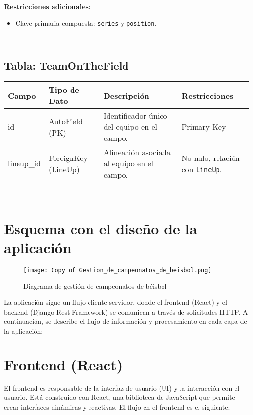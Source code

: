 \documentclass{report}
\begin{document}
    \textbf{Restricciones adicionales:}
    \begin{itemize}
        \item Clave primaria compuesta: \texttt{series} y \texttt{position}.
    \end{itemize}
    
    ---
    
    \subsection*{Tabla: TeamOnTheField}
    \begin{tabular}{|>{\raggedright\arraybackslash}p{3cm}|>{\raggedright\arraybackslash}p{3cm}|>{\raggedright\arraybackslash}p{6cm}|>{\raggedright\arraybackslash}p{4cm}|}
        \hline
        \textbf{Campo} & \textbf{Tipo de Dato} & \textbf{Descripción} & \textbf{Restricciones} \\
        \hline
        id & AutoField (PK) & Identificador único del equipo en el campo. & Primary Key \\
        \hline
        lineup\_id & ForeignKey (LineUp) & Alineación asociada al equipo en el campo. & No nulo, relación con \texttt{LineUp}. \\
        \hline
    \end{tabular}
    
    ---
    
    \section*{Esquema con el diseño de la aplicación}
    \begin{figure}[h]
        \centering
        \texttt{[image: Copy of Gestion\_de\_campeonatos\_de\_beisbol.png]}
        \caption{Diagrama de gestión de campeonatos de béisbol}
        \label{fig:gestion_campeonatos}
    \end{figure}
    La aplicación sigue un flujo cliente-servidor, donde el frontend (React) y el backend (Django Rest Framework) se comunican a través de solicitudes HTTP. A continuación, se describe el flujo de información y procesamiento en cada capa de la aplicación:

    \section*{Frontend (React)}
    El frontend es responsable de la interfaz de usuario (UI) y la interacción con el usuario. Está construido con React, una biblioteca de JavaScript que permite crear interfaces dinámicas y reactivas. El flujo en el frontend es el siguiente:
    
\end{document}
